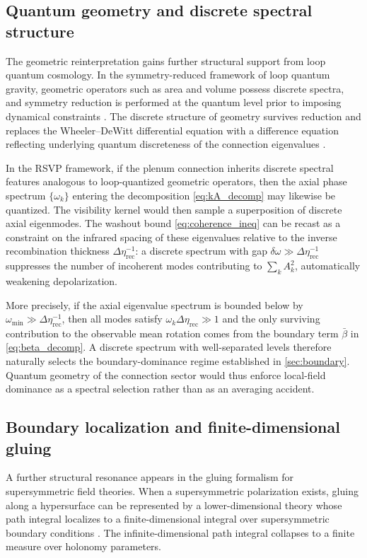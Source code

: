 \documentclass[12pt]{article}
\theoremstyle{definition}
\newcommand{\Wrec}{\Delta\eta_{\mathrm{rec}}}
\begin{document}
\subsection{Quantum geometry and discrete spectral structure}

The geometric reinterpretation gains further structural support from loop quantum cosmology. In the symmetry-reduced framework of loop quantum gravity, geometric operators such as area and volume possess discrete spectra, and symmetry reduction is performed at the quantum level prior to imposing dynamical constraints \cite{Bojowald2000,Ashtekar2006}. The discrete structure of geometry survives reduction and replaces the Wheeler--DeWitt differential equation with a difference equation reflecting underlying quantum discreteness of the connection eigenvalues \cite{Thiemann2007}.

In the RSVP framework, if the plenum connection inherits discrete spectral features analogous to loop-quantized geometric operators, then the axial phase spectrum $\{\omega_k\}$ entering the decomposition \eqref{eq:kA_decomp} may likewise be quantized. The visibility kernel would then sample a superposition of discrete axial eigenmodes. The washout bound \eqref{eq:coherence_ineq} can be recast as a constraint on the infrared spacing of these eigenvalues relative to the inverse recombination thickness $\Wrec^{-1}$: a discrete spectrum with gap $\delta\omega\gg\Wrec^{-1}$ suppresses the number of incoherent modes contributing to $\sum_k A_k^2$, automatically weakening depolarization.

More precisely, if the axial eigenvalue spectrum is bounded below by $\omega_{\min}\gg\Wrec^{-1}$, then all modes satisfy $\omega_k\Wrec\gg1$ and the only surviving contribution to the observable mean rotation comes from the boundary term $\bar\beta$ in \eqref{eq:beta_decomp}. A discrete spectrum with well-separated levels therefore naturally selects the boundary-dominance regime established in \cref{sec:boundary}. Quantum geometry of the connection sector would thus enforce local-field dominance as a spectral selection rather than as an averaging accident.

\subsection{Boundary localization and finite-dimensional gluing}

A further structural resonance appears in the gluing formalism for supersymmetric field theories. When a supersymmetric polarization exists, gluing along a hypersurface can be represented by a lower-dimensional theory whose path integral localizes to a finite-dimensional integral over supersymmetric boundary conditions \cite{Dedushenko2021}. The infinite-dimensional path integral collapses to a finite measure over holonomy parameters.
\end{document}
